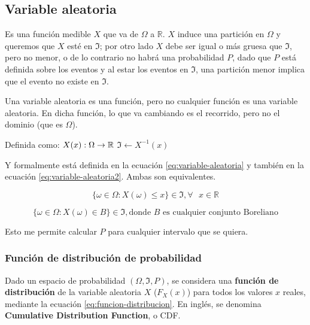 \documentclass[]{article}
\begin{document}
\subsection{Variable aleatoria}\label{variable-aleatoria}

Es una función medible \(X\) que va de \(\Omega\) a \(\mathbb{R}\).
\(X\) induce una partición en \(\Omega\) y queremos que \(X\) esté en
\(\Im\); por otro lado \(X\) debe ser igual o más gruesa que \(\Im\),
pero no menor, o de lo contrario no habrá una probabilidad \(P\), dado
que \(P\) está definida sobre los eventos y al estar los eventos en
\(\Im\), una partición menor implica que el evento no existe en \(\Im\).

Una variable aleatoria es una función, pero no cualquier función es una
variable aleatoria. En dicha función, lo que va cambiando es el
recorrido, pero no el dominio (que es \(\Omega\)).

Definida como: \(X(x): \Omega \rightarrow \mathbb{R} \\\)
\(\Im \leftarrow X^{-1}(x)\)

Y formalmente está definida en la ecuación \eqref{eq:variable-aleatoria} y
también en la ecuación \eqref{eq:variable-aleatoria2}. Ambas son
equivalentes.

\begin{equation}
\{\omega \in \Omega:X(\omega) \leq x\} \in \Im, \forall \text{ } x \in \mathbb{R}
\label{eq:variable-aleatoria}
\end{equation}

\begin{equation}
\{\omega \in \Omega:X(\omega) \in B\} \in \Im, \text{donde } B \text{ es cualquier conjunto Boreliano}
\label{eq:variable-aleatoria2}
\end{equation}

Esto me permite calcular \(P\) para cualquier intervalo que se quiera.

\subsubsection{Función de distribución de
probabilidad}\label{funcion-de-distribucion-de-probabilidad}

Dado un espacio de probabilidad \((\Omega, \Im, P)\), se considera una
\textbf{función de distribución} de la variable aleatoria \(X\)
(\(F_X(x)\)) para todos los valores \(x\) reales, mediante la ecuación
\eqref{eq:funcion-distribucion}. En inglés, se denomina \textbf{Cumulative
Distribution Function}, o CDF.
\end{document}
